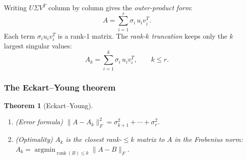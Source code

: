 \documentclass[11pt]{article}
\theoremstyle{definition}
\theoremstyle{plain}
\newtheorem{theorem}{Theorem}[section]
\begin{document}
Writing $U\Sigma V^T$ column by column gives the \emph{outer-product form}:
\[
  A = \sum_{i=1}^r \sigma_i\, u_i v_i^T.
\]
Each term $\sigma_i u_i v_i^T$ is a rank-1 matrix.  The \emph{rank-$k$
truncation} keeps only the $k$ largest singular values:
\[
  A_k = \sum_{i=1}^k \sigma_i\, u_i v_i^T, \qquad k \le r.
\]

\subsubsection{The Eckart--Young theorem}

\begin{theorem}[Eckart--Young]\label{thm:eckart-young}
  \leavevmode
  \begin{enumerate}
    \item \textup{(Error formula)} $\displaystyle\|A - A_k\|_F^2 = \sigma_{k+1}^2 + \cdots + \sigma_r^2$.
    \item \textup{(Optimality)} $A_k$ is the closest rank-$\le k$ matrix to $A$
          in the Frobenius norm:
          $A_k = \operatorname*{argmin}_{\operatorname{rank}(B)\le k} \|A - B\|_F$.
  \end{enumerate}
\end{theorem}
\end{document}
